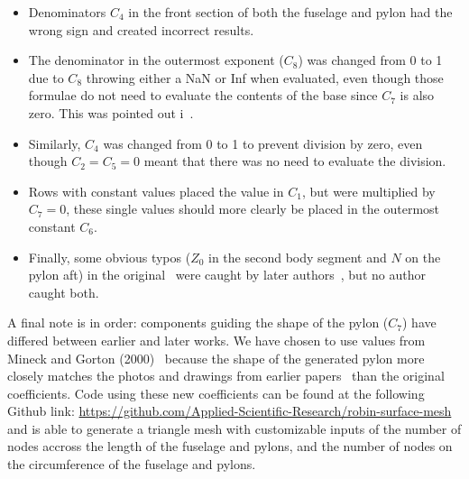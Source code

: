 \documentclass{ahs}
\begin{document}
\begin{itemize}
\item Denominators $C_{4}$ in the front section of both the fuselage and pylon had the wrong sign
and created incorrect results.
\item The denominator in the outermost exponent ($C_{8}$) was changed from 0 to 1 due to $C_{8}$ throwing either a NaN or Inf when evaluated, even though those formulae do not need to evaluate the contents of the base since $C_{7}$ is also zero. This was pointed out i~\cite{nasa87762}.
\item Similarly, $C_{4}$ was changed from 0 to 1 to prevent division by zero, even though
$C_{2}=C_{5}=0$ meant that there was no need to evaluate the division.
\item Rows with constant values placed the value in $C_{1}$, but were multiplied by $C_{7}=0$,
these single values should more clearly be placed in the outermost constant $C_{6}$.
\item Finally, some obvious typos ($Z_0$ in the second body segment and $N$ on the pylon aft)
in the original~ were caught by later authors~, but no author caught both.
\end{itemize}

A final note is in order: components guiding the shape of the pylon ($C_{7}$) have differed
between earlier and later works. We have chosen to use values from Mineck and Gorton (2000)~ because the shape of the generated 
pylon more closely matches the photos and drawings from earlier papers~ than the original coefficients. Code using these 
new coefficients can be found at the following Github link: \url{https://github.com/Applied-Scientific-Research/robin-surface-mesh}~ 
and is able to generate a triangle mesh with customizable inputs of the number of nodes accross the length of the fuselage and pylons, and the number of 
nodes on the circumference of the fuselage and pylons.



\end{document}
